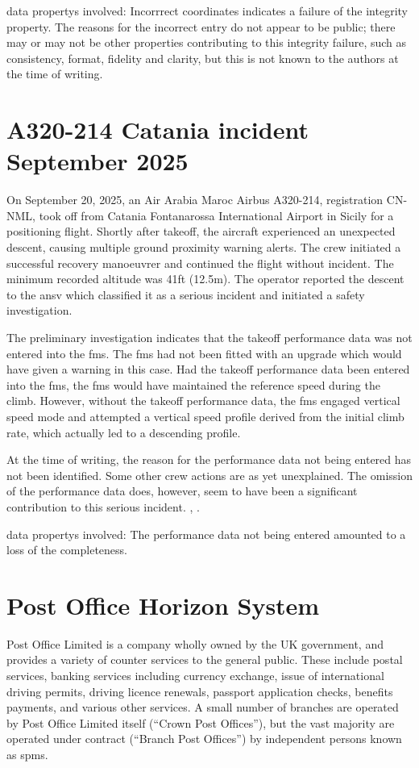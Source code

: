 \Glspl{data property} involved: Incorrrect coordinates indicates a failure of the \gls{integrity} property. The reasons for the incorrect entry do not appear to be public; there may or may not be other properties contributing to this \gls{integrity} failure, such as \gls{consistency}, \gls{format}, \gls{fidelity} and \gls{clarity}, but this is not known to the authors at the time of writing.


\section{A320-214 Catania incident September 2025}\label{bkm:inacc:mac991}
On September 20, 2025, an Air Arabia Maroc Airbus A320-214, registration CN-NML, took off from Catania Fontanarossa International Airport in Sicily for a positioning flight. Shortly after takeoff, the aircraft experienced an unexpected descent, causing multiple ground proximity warning alerts. The crew initiated a successful recovery manoeuvrer and continued the flight without incident. The minimum recorded altitude was 41ft  (12.5m). The operator reported the descent to the \gls{ansv} which classified it as a serious incident and initiated a safety investigation.

The preliminary investigation indicates that the takeoff performance data was not entered into the \gls{fms}. The \gls{fms} had not been fitted with an upgrade which would have given a warning in this case. Had the takeoff performance data been entered into the \gls{fms}, the \gls{fms} would have maintained the reference speed during the climb. However, without the takeoff performance data, the \gls{fms} engaged vertical speed mode and attempted a vertical speed profile derived from the initial climb rate, which actually led to a descending profile.

At the time of writing, the reason for the performance data not being entered has not been identified. Some other crew actions are as yet unexplained. The omission of the performance data does, however, seem to have been a significant contribution to this serious incident. \cite{citation:inacc:mac991}, \cite{citation:inacc:mac991:prelim}.

\Glspl{data property} involved: The performance data not being entered amounted to a loss of the {\gls{completeness}}.

\section{Post Office Horizon System}\label{bkm:incacc:horizon}
Post Office Limited is a company wholly owned by the UK government, and provides a variety of counter services to the general public. These include postal services, banking services including currency exchange, issue of international driving permits, driving licence renewals, passport application checks, benefits payments, and various other services. A small number of branches are operated by Post Office Limited itself (``Crown Post Offices''), but the vast majority are operated under contract (``Branch Post Offices'') by independent persons known as \glspl{spm}.


